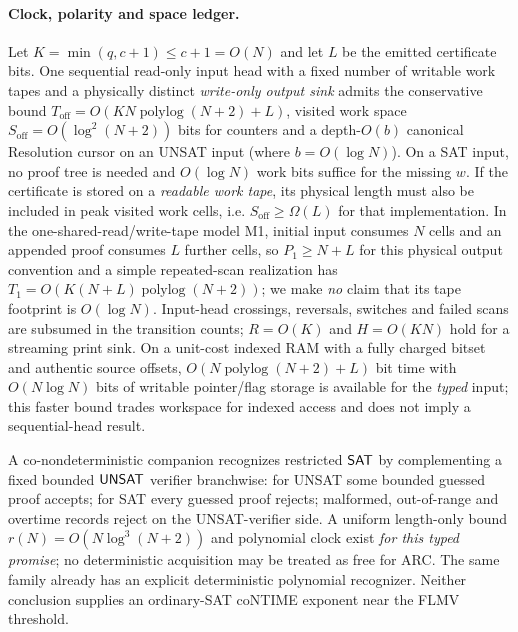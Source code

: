 \paragraph{Clock, polarity and space ledger.}
Let $K=\min(q,c+1)\le c+1=O(N)$ and let $L$ be the emitted certificate bits. One sequential read-only input head with a fixed number of writable work tapes and a physically distinct \emph{write-only output sink} admits the conservative bound $T_{\mathrm{off}}=O(KN\operatorname{polylog}(N+2)+L)$, visited work space $S_{\mathrm{off}}=O(\log^2(N+2))$ bits for counters and a depth-$O(b)$ canonical Resolution cursor on an UNSAT input (where $b=O(\log N)$). On a SAT input, no proof tree is needed and $O(\log N)$ work bits suffice for the missing $w$. If the certificate is stored on a \emph{readable work tape}, its physical length must also be included in peak visited work cells, i.e. $S_{\mathrm{off}}\ge\Omega(L)$ for that implementation. In the one-shared-read/write-tape model M1, initial input consumes $N$ cells and an appended proof consumes $L$ further cells, so $P_1\ge N+L$ for this physical output convention and a simple repeated-scan realization has $T_1=O(K(N+L)\operatorname{polylog}(N+2))$; we make \emph{no} claim that its tape footprint is $O(\log N)$. Input-head crossings, reversals, switches and failed scans are subsumed in the transition counts; $R=O(K)$ and $H=O(KN)$ hold for a streaming print sink. On a unit-cost indexed RAM with a fully charged bitset and authentic source offsets, $O(N\operatorname{polylog}(N+2)+L)$ bit time with $O(N\log N)$ bits of writable pointer/flag storage is available for the \emph{typed} input; this faster bound trades workspace for indexed access and does not imply a sequential-head result.

A co-nondeterministic companion recognizes restricted $\mathsf{SAT}$ by complementing a fixed bounded $\mathsf{UNSAT}$ verifier branchwise: for UNSAT some bounded guessed proof accepts; for SAT every guessed proof rejects; malformed, out-of-range and overtime records reject on the UNSAT-verifier side. A uniform length-only bound $r(N)=O(N\log^3(N+2))$ and polynomial clock exist \emph{for this typed promise}; no deterministic acquisition may be treated as free for ARC. The same family already has an explicit deterministic polynomial recognizer. Neither conclusion supplies an ordinary-SAT coNTIME exponent near the FLMV threshold.

